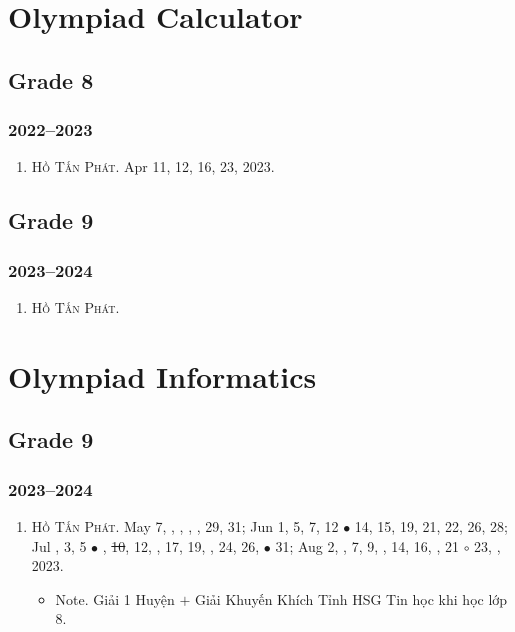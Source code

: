\documentclass{article}
\begin{document}
\section{Olympiad Calculator}

\subsection{Grade 8}

\subsubsection{2022--2023}

\begin{enumerate}
	\item \textsc{Hồ Tấn Phát.} {\sf[In]} Apr 11, 12, 16, 23, 2023.
\end{enumerate}


\subsection{Grade 9}

\subsubsection{2023--2024}

\begin{enumerate}
	\item \textsc{Hồ Tấn Phát.}
\end{enumerate}


\section{Olympiad Informatics}

\subsection{Grade 9}

\subsubsection{2023--2024}

\begin{enumerate}
	\item \textsc{Hồ Tấn Phát.} May 7, , , , , 29, 31; Jun 1, 5, 7, 12 $\bullet$ 14, 15, 19, 21, 22, 26, 28; Jul , 3, 5 $\bullet$ , \st{10}, 12, , 17, 19, , 24, 26,  $\bullet$ 31; Aug 2, , 7, 9, , 14, 16, , 21 $\circ$ 23, , 2023.
	\begin{itemize}
		\item {\sf Note.} Giải 1 Huyện $+$ Giải Khuyến Khích Tỉnh HSG Tin học khi học lớp 8.
	\end{itemize}
\end{enumerate}
\end{document}
